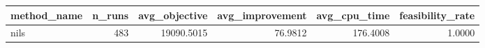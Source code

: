 \begin{tabular}{lrrrrr}
\toprule
method_name & n_runs & avg_objective & avg_improvement & avg_cpu_time & feasibility_rate \\
\midrule
nils & 483 & 19090.5015 & 76.9812 & 176.4008 & 1.0000 \\
\bottomrule
\end{tabular}
